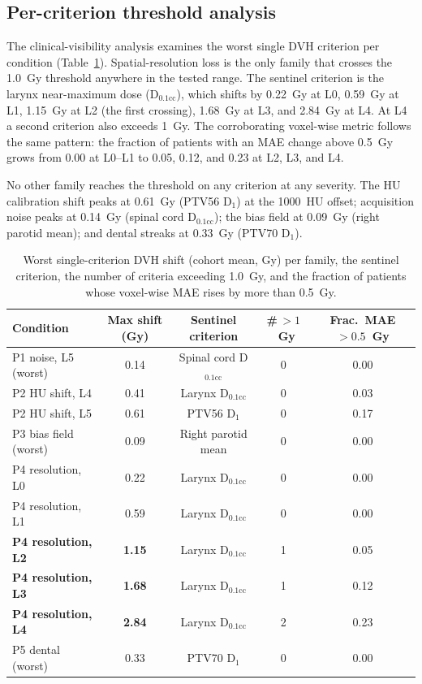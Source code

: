 \documentclass[11pt]{article}
\begin{document}
\subsection{Per-criterion threshold analysis}

The clinical-visibility analysis examines the worst single DVH criterion per
condition (Table~\ref{tab:threshold}). Spatial-resolution loss is the only
family that crosses the 1.0~Gy threshold anywhere in the tested range. The
sentinel criterion is the larynx near-maximum dose (D$_{0.1\mathrm{cc}}$),
which shifts by 0.22~Gy at L0, 0.59~Gy at L1, 1.15~Gy at L2 (the first
crossing), 1.68~Gy at L3, and 2.84~Gy at L4. At L4 a second criterion also
exceeds 1~Gy. The corroborating voxel-wise metric follows the same pattern:
the fraction of patients with an MAE change above 0.5~Gy grows from 0.00 at
L0--L1 to 0.05, 0.12, and 0.23 at L2, L3, and L4.

No other family reaches the threshold on any criterion at any severity. The
HU calibration shift peaks at 0.61~Gy (PTV56 D$_1$) at the 1000~HU offset;
acquisition noise peaks at 0.14~Gy (spinal cord D$_{0.1\mathrm{cc}}$); the
bias field at 0.09~Gy (right parotid mean); and dental streaks at 0.33~Gy
(PTV70 D$_1$).

\begin{table}[t]
\centering
\caption{Worst single-criterion DVH shift (cohort mean, Gy) per family, the
sentinel criterion, the number of criteria exceeding 1.0~Gy, and the fraction
of patients whose voxel-wise MAE rises by more than 0.5~Gy.}
\label{tab:threshold}
\small
\begin{tabular}{lcccc}
\toprule
Condition & Max shift (Gy) & Sentinel criterion & \#\,$>1$~Gy & Frac.\ MAE$>0.5$~Gy \\
\midrule
P1 noise, L5 (worst) & 0.14 & Spinal cord D$_{0.1\mathrm{cc}}$ & 0 & 0.00 \\
P2 HU shift, L4 & 0.41 & Larynx D$_{0.1\mathrm{cc}}$ & 0 & 0.03 \\
P2 HU shift, L5 & 0.61 & PTV56 D$_1$ & 0 & 0.17 \\
P3 bias field (worst) & 0.09 & Right parotid mean & 0 & 0.00 \\
P4 resolution, L0 & 0.22 & Larynx D$_{0.1\mathrm{cc}}$ & 0 & 0.00 \\
P4 resolution, L1 & 0.59 & Larynx D$_{0.1\mathrm{cc}}$ & 0 & 0.00 \\
\textbf{P4 resolution, L2} & \textbf{1.15} & Larynx D$_{0.1\mathrm{cc}}$ & 1 & 0.05 \\
\textbf{P4 resolution, L3} & \textbf{1.68} & Larynx D$_{0.1\mathrm{cc}}$ & 1 & 0.12 \\
\textbf{P4 resolution, L4} & \textbf{2.84} & Larynx D$_{0.1\mathrm{cc}}$ & 2 & 0.23 \\
P5 dental (worst) & 0.33 & PTV70 D$_1$ & 0 & 0.00 \\
\bottomrule
\end{tabular}
\end{table}
\end{document}

